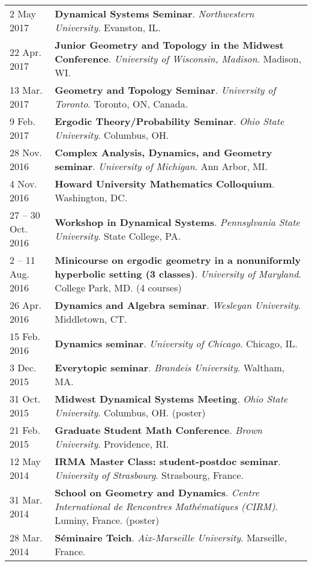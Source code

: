 \begin{center}
{\begin{longtable}{p{}  p{}}
2 May  2017 & \textbf{Dynamical Systems Seminar}. \textit{Northwestern University}.  Evanston, IL.  \\ 
22 Apr.  2017 & \textbf{Junior Geometry and Topology in the Midwest Conference}. \textit{University of Wisconsin, Madison}.  Madison, WI.  \\ 
13 Mar.  2017 & \textbf{Geometry and Topology Seminar}. \textit{University of Toronto}.  Toronto, ON, Canada.  \\ 
9 Feb.  2017 & \textbf{Ergodic Theory/Probability Seminar}. \textit{Ohio State University}.  Columbus, OH.  \\ 
28 Nov.  2016 & \textbf{Complex Analysis, Dynamics, and Geometry seminar}. \textit{University of Michigan}.  Ann Arbor, MI.  \\ 
4 Nov.  2016 & \textbf{Howard University Mathematics Colloquium}.  Washington, DC.  \\ 
27  -- 30 Oct.  2016 & \textbf{Workshop in Dynamical Systems}. \textit{Pennsylvania State University}.  State College, PA.  \\ 
2  -- 11 Aug.  2016 & \textbf{Minicourse on ergodic geometry in a nonuniformly hyperbolic setting (3 classes)}. \textit{University of Maryland}.  College Park, MD. (4 courses) \\ 
26 Apr.  2016 & \textbf{Dynamics and Algebra seminar}. \textit{Wesleyan University}.  Middletown, CT.  \\ 
15 Feb.  2016 & \textbf{Dynamics seminar}. \textit{University of Chicago}.  Chicago, IL.  \\ 
3 Dec.  2015 & \textbf{Everytopic seminar}. \textit{Brandeis University}.  Waltham, MA.  \\ 
31 Oct.  2015 & \textbf{Midwest Dynamical Systems Meeting}. \textit{Ohio State University}.  Columbus, OH. (poster) \\ 
21 Feb.  2015 & \textbf{Graduate Student Math Conference}. \textit{Brown University}.  Providence, RI.  \\ 
12 May  2014 & \textbf{IRMA Master Class: student-postdoc seminar}. \textit{University of Strasbourg}.  Strasbourg, France.  \\ 
31 Mar.  2014 & \textbf{School on Geometry and Dynamics}. \textit{Centre International de Rencontres Math\'ematiques (CIRM)}.  Luminy, France. (poster) \\ 
28 Mar.  2014 & \textbf{S\'eminaire Teich}. \textit{Aix-Marseille University}.  Marseille, France.  
    \end{longtable}
    } 
    \end{center}


